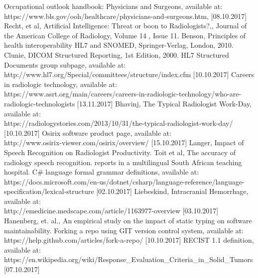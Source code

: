 \documentclass[12pt, twoside, openany]{report}
\theoremstyle{definition}
\begin{document}

\begin{thebibliography}{11}
 Occupational outlook handbook: Physicians and Surgeons, available at:\\ https://www.bls.gov/ooh/healthcare/physicians-and-surgeons.htm, [08.10.2017]
 Recht, et al, Artificial Intelligence: Threat or boon to Radiologists?,, Journal of the American College of Radiology, Volume 14 , Issue 11.
 Benson, Principles of health interoperability HL7 and SNOMED, Springer-Verlag, London, 2010.
 Clunie, DICOM Structured Reporting, 1st Edition, 2000.
 HL7 Structured Documents group subpage, available at:\\ http://www.hl7.org/Special/committees/structure/index.cfm  [10.10.2017]
 Careers in radiologic technology, available at:\\ https://www.asrt.org/main/careers/careers-in-radiologic-technology/who-are-radiologic-technologists [13.11.2017]
Bhavinj, The Typical Radiologist Work-Day, available at: \\ https://radiologystories.com/2013/10/31/the-typical-radiologist-work-day/ [10.10.2017]
 Osirix software product page, available at:\\
http://www.osirix-viewer.com/osirix/overview/ [15.10.2017]
Langer, Impact of Speech Recognition on Radiologist Productivity.
 Toit et al, The accuracy of radiology speech recognition.
reports in a multilingual South African teaching hospital.
 C\# language formal grammar definitions, available at:\\
https://docs.microsoft.com/en-us/dotnet/csharp/language-reference/language-specification/lexical-structure [02.10.2017]
 Liebeskind, Intracranial Hemorrhage, available at: \\ http://emedicine.medscape.com/article/1163977-overview [03.10.2017]
Hanenberg, et. al., An empirical study on the impact of static typing on software maintainability.
 Forking a repo using GIT version control system, available at: \\ https://help.github.com/articles/fork-a-repo/ [10.10.2017]
RECIST 1.1 definition, available at:\\ https://en.wikipedia.org/wiki/Response\_Evaluation\_Criteria\_in\_Solid\_Tumors [07.10.2017]

\end{thebibliography}
\end{document}
